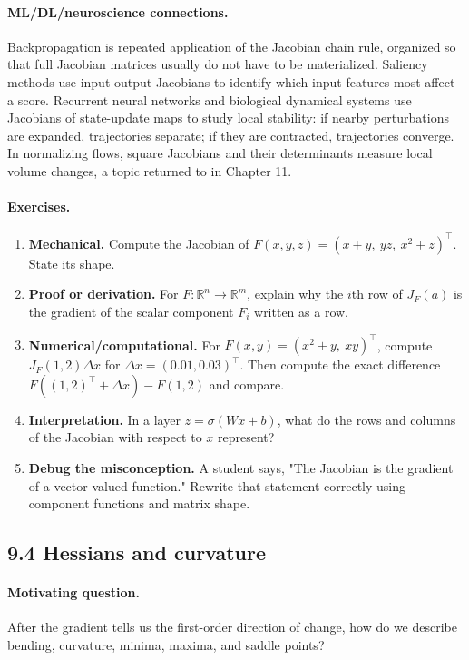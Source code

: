 \paragraph{ML/DL/neuroscience connections.}
Backpropagation is repeated application of the Jacobian chain rule, organized so that full Jacobian matrices usually do not have to be materialized. Saliency methods use input-output Jacobians to identify which input features most affect a score. Recurrent neural networks and biological dynamical systems use Jacobians of state-update maps to study local stability: if nearby perturbations are expanded, trajectories separate; if they are contracted, trajectories converge. In normalizing flows, square Jacobians and their determinants measure local volume changes, a topic returned to in Chapter 11.

\paragraph{Exercises.}
\begin{enumerate}[label=\textbf{9.3.\arabic*.}, leftmargin=*]
\item \textbf{Mechanical.} Compute the Jacobian of \(F(x,y,z)=(x+y,\ yz,\ x^2+z)^\top\). State its shape.
\item \textbf{Proof or derivation.} For \(F:\mathbb{R}^n\to\mathbb{R}^m\), explain why the \(i\)th row of \(J_F(a)\) is the gradient of the scalar component \(F_i\) written as a row.
\item \textbf{Numerical/computational.} For \(F(x,y)=(x^2+y,\ xy)^\top\), compute \(J_F(1,2)\Delta x\) for \(\Delta x=(0.01,0.03)^\top\). Then compute the exact difference \(F((1,2)^\top+\Delta x)-F(1,2)\) and compare.
\item \textbf{Interpretation.} In a layer \(z=\sigma(Wx+b)\), what do the rows and columns of the Jacobian with respect to \(x\) represent?
\item \textbf{Debug the misconception.} A student says, "The Jacobian is the gradient of a vector-valued function." Rewrite that statement correctly using component functions and matrix shape.
\end{enumerate}

\subsection{9.4 Hessians and curvature}

\paragraph{Motivating question.}
After the gradient tells us the first-order direction of change, how do we describe bending, curvature, minima, maxima, and saddle points?

